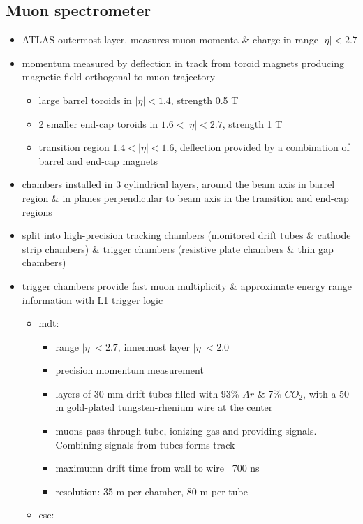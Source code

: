 \documentclass[../thesis.tex]{subfiles}
\begin{document}
\subsection{Muon spectrometer}
\begin{itemize}
\item ATLAS outermost layer. measures muon momenta \& charge in range $|\eta|<2.7$
\item momentum measured by deflection in track from toroid magnets producing magnetic field orthogonal to muon trajectory
\begin{itemize}
\item large barrel toroids in $|\eta|<1.4$, strength 0.5 T
\item 2 smaller end-cap toroids in $1.6<|\eta|<2.7$, strength 1 T
\item transition region $1.4<|\eta|<1.6$, deflection provided by a combination of barrel and end-cap magnets
\end{itemize}
\item chambers installed in 3 cylindrical layers, around the beam axis in barrel region \& in planes perpendicular to beam axis in the transition and end-cap regions
\item split into high-precision tracking chambers (monitored drift tubes \& cathode strip chambers) \& trigger chambers (resistive plate chambers \& thin gap chambers)
\item trigger chambers provide fast muon multiplicity \& approximate energy range information with L1 trigger logic
\begin{multicols}{2}
\begin{itemize}
\item mdt:
	\begin{itemize}
	\item range $|\eta|<2.7$, innermost layer $|\eta|<2.0$
	\item precision momentum measurement
	\item layers of 30 mm drift tubes filled with 93\% $Ar$ \& 7\% $CO_2$, with a 50 \textmu m gold-plated tungsten-rhenium wire at the center
	\item muons pass through tube, ionizing gas and providing signals. Combining signals from tubes forms track
	\item maximumn drift time from wall to wire ~700 ns
	\item resolution: 35 \textmu m per chamber, 80 \textmu m per tube
	\end{itemize}
\item csc:

\end{itemize}
\end{multicols}
\end{itemize}
\end{document}
